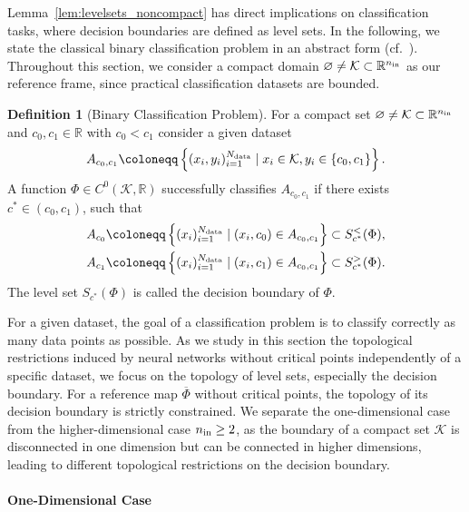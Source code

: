 \documentclass[10pt]{article}
\theoremstyle{definition}
\newtheorem{definition}[theorem]{Definition}
\numberwithin{equation}{section}
\newcommand{\R}{\mathbb{R}}
\newcommand*{\nin}{n_\textup{in}}
\begin{document}
Lemma~\ref{lem:levelsets_noncompact} has direct implications on classification tasks, where decision boundaries are defined as level sets. In the following, we state the classical binary classification problem in an abstract form (cf.~\cite{boyd2004convex}). Throughout this section, we consider a compact domain $\varnothing \neq \mathcal{K}\subset \R^{\nin}$ as our reference frame, since practical classification datasets are bounded.

\begin{definition}[Binary Classification Problem]\label{def:binary_classification}
    For a compact set $\varnothing \neq \mathcal{K} \subset \R^{\nin}$ and $c_0,c_1\in\R$ with $c_0<c_1$ consider a given dataset
    \begin{equation*}
        A_{c_0,c_1} \coloneqq \left\{ (x_i,y_i)_{i = 1}^{N_\textup{data}} \mid x_i \in \mathcal{K}, y_i \in \{c_0,c_1\}\right\}.
    \end{equation*}
    A function $\Phi\in C^0(\mathcal{K},\R)$ successfully classifies $A_{c_0,c_1}$ if there exists $c^\ast\in (c_0,c_1)$, such that
    \begin{align*}
         &A_{c_0} \coloneqq \left\{ (x_i)_{i = 1}^{N_\textup{data}} \mid (x_i,c_0) \in A_{c_0,c_1}\right\}\subset S_{c^\ast}^{<}(\Phi), \\
         &A_{c_1} \coloneqq \left\{ (x_i)_{i = 1}^{N_\textup{data}} \mid (x_i,c_1) \in A_{c_0,c_1}\right\} \subset S_{c^\ast}^{>}(\Phi).
    \end{align*}
   The level set $S_{c^\ast}(\Phi)$ is called the decision boundary of $\Phi$. 
\end{definition}

For a given dataset, the goal of a classification problem is to classify correctly as many data points as possible. As we study in this section the topological restrictions induced by neural networks without critical points independently of a specific dataset, we focus on the topology of level sets, especially the decision boundary. For a reference map $\overline{\Phi}$ without critical points, the topology of its decision boundary is strictly constrained. We separate the one-dimensional case from the higher-dimensional case $\nin \geq 2$, as the boundary of a compact set $\mathcal{K}$ is disconnected in one dimension but can be connected in higher dimensions, leading to different topological restrictions on the decision boundary. 

\paragraph{One-Dimensional Case}
\end{document}
